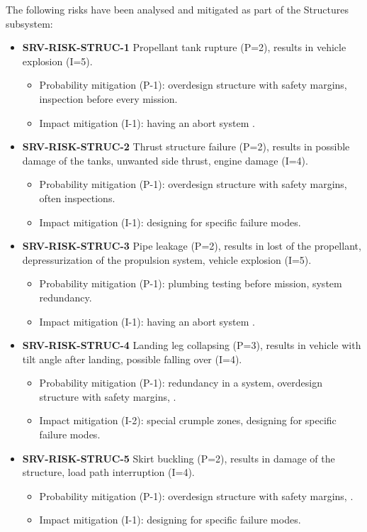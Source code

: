 \noindent The following risks have been analysed and mitigated as part of the Structures subsystem:

\begin{itemize}
	 \item \textbf{SRV-RISK-STRUC-1} Propellant tank rupture (P=2), results in vehicle explosion (I=5).
	\begin{itemize}
		 \item Probability mitigation (P-1): overdesign structure with safety margins, inspection before every mission.		 \item Impact mitigation (I-1): having an abort system .	\end{itemize}
	 \item \textbf{SRV-RISK-STRUC-2} Thrust structure failure (P=2), results in possible damage of the tanks, unwanted side thrust, engine damage (I=4).
	\begin{itemize}
		 \item Probability mitigation (P-1): overdesign structure with safety margins, often inspections.		 \item Impact mitigation (I-1): designing for specific failure modes.	\end{itemize}
	 \item \textbf{SRV-RISK-STRUC-3} Pipe leakage (P=2), results in lost of the propellant, depressurization of the propulsion system, vehicle explosion (I=5).
	\begin{itemize}
		 \item Probability mitigation (P-1): plumbing testing before mission, system redundancy.		 \item Impact mitigation (I-1): having an abort system .	\end{itemize}
	 \item \textbf{SRV-RISK-STRUC-4} Landing leg collapsing (P=3), results in vehicle with tilt angle after landing, possible falling over (I=4).
	\begin{itemize}
		 \item Probability mitigation (P-1): redundancy in a system, overdesign structure with safety margins, .		 \item Impact mitigation (I-2): special crumple zones, designing for specific failure modes.	\end{itemize}
	 \item \textbf{SRV-RISK-STRUC-5} Skirt buckling (P=2), results in damage of the structure, load path interruption (I=4).
	\begin{itemize}
		 \item Probability mitigation (P-1): overdesign structure with safety margins, .		 \item Impact mitigation (I-1): designing for specific failure modes.	\end{itemize}

\end{itemize}
